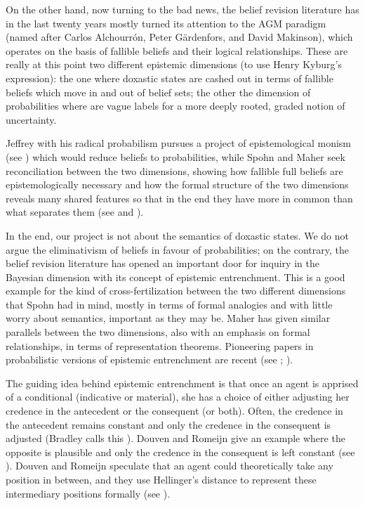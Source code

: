 \documentclass[11pt]{article}
\begin{document}
On the other hand, now turning to the bad news, the belief revision
literature has in the last twenty years mostly turned its attention to
the AGM paradigm (named after Carlos Alchourr{\'o}n, Peter
G{\"a}rdenfors, and David Makinson), which operates on the basis of
fallible beliefs and their logical relationships. These are really at
this point two different epistemic dimensions (to use Henry Kyburg's
expression): the one where doxastic states are cashed out in terms of
fallible beliefs which move in and out of belief sets; the other the
dimension of probabilities where  are vague labels for a
more deeply rooted, graded notion of uncertainty. 

Jeffrey with his radical probabilism pursues a project of
epistemological monism (see ) which would reduce
beliefs to probabilities, while Spohn and Maher seek reconciliation
between the two dimensions, showing how fallible full beliefs are
epistemologically necessary and how the formal structure of the two
dimensions reveals many shared features so that in the end they have
more in common than what separates them (see 
and ).

In the end, our project is not about the semantics of doxastic states.
We do not argue the eliminativism of beliefs in favour of
probabilities; on the contrary, the belief revision literature has
opened an important door for inquiry in the Bayesian dimension with
its concept of epistemic entrenchment. This is a good example for the
kind of cross-fertilization between the two different dimensions that
Spohn had in mind, mostly in terms of formal analogies and with little
worry about semantics, important as they may be. Maher has given
similar parallels between the two dimensions, also with an emphasis on
formal relationships, in terms of representation theorems. Pioneering
papers in probabilistic versions of epistemic entrenchment are recent
(see ; ).

The guiding idea behind epistemic entrenchment is that once an agent
is apprised of a conditional (indicative or material), she has a
choice of either adjusting her credence in the antecedent or the
consequent (or both). Often, the credence in the antecedent remains
constant and only the credence in the consequent is adjusted (Bradley
calls this ). Douven and Romeijn give an
example where the opposite is plausible and only the credence in the
consequent is left constant (see ).
Douven and Romeijn speculate that an agent could theoretically take
any position in between, and they use Hellinger's distance to
represent these intermediary positions formally (see
).
\end{document}
